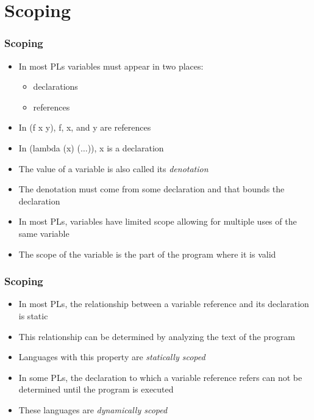 \documentclass{beamer}
\newcommand{\dotss}{\(\ldots\)}
\begin{document}
\section{Scoping}

\begin{frame}[fragile]
\frametitle{Scoping}
\begin{scriptsize}
\begin{itemize}
\item<1-> In most PLs variables must appear in two places:
  \begin{itemize}
    \item declarations
    \item references
  \end{itemize}

\item<2-> In (f x y), f, x, and y are references

\item<3-> In (lambda (x) (\dotss{})), x is a declaration

\item<4-> The value of a variable is also called its \emph{denotation}

\item<4-> The denotation must come from some declaration and that bounds the declaration

\item<5-> In most PLs, variables have limited scope allowing for multiple uses of the same variable

\item<5-> The scope of the variable is the part of the program where it is valid

\end{itemize}
\end{scriptsize}
\end{frame}

\begin{frame}[fragile]
\frametitle{Scoping}
\begin{scriptsize}
\begin{itemize}
\item<1-> In most PLs, the relationship between a variable reference and its declaration is static

\item<1-> This relationship can be determined by analyzing the text of the program

\item<1-> Languages with this property are \emph{statically scoped}

\item<2-> In some PLs, the declaration to which a variable reference refers can not be determined until the program is executed

\item<2-> These languages are \emph{dynamically scoped}

\end{itemize}
\end{scriptsize}
\end{frame}
\end{document}
